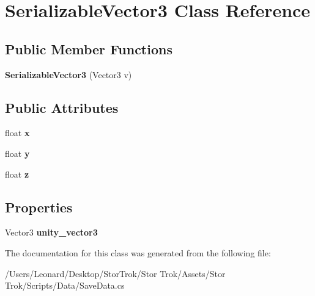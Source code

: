 \hypertarget{class_serializable_vector3}{}\section{Serializable\+Vector3 Class Reference}
\label{class_serializable_vector3}
\subsection*{Public Member Functions}
\begin{DoxyCompactItemize}
\item 
\mbox{\label{class_serializable_vector3_ab073e8b441ca058941b210fea754373c}} 
{\bfseries Serializable\+Vector3} (Vector3 v)
\end{DoxyCompactItemize}
\subsection*{Public Attributes}
\begin{DoxyCompactItemize}
\item 
\mbox{\label{class_serializable_vector3_a3528822b63a9561c84907caf93017a97}} 
float {\bfseries x}
\item 
\mbox{\label{class_serializable_vector3_ae16fc8bdcb05ef764ceb25d184e5a357}} 
float {\bfseries y}
\item 
\mbox{\label{class_serializable_vector3_a711c36688d7ead70f2169053edb9223c}} 
float {\bfseries z}
\end{DoxyCompactItemize}
\subsection*{Properties}
\begin{DoxyCompactItemize}
\item 
\mbox{\label{class_serializable_vector3_a093752c15e617cbe59247e227993778b}} 
Vector3 {\bfseries unity\+\_\+vector3}
\end{DoxyCompactItemize}


The documentation for this class was generated from the following file\+:\begin{DoxyCompactItemize}
\item 
/\+Users/\+Leonard/\+Desktop/\+Stor\+Trok/\+Stor Trok/\+Assets/\+Stor Trok/\+Scripts/\+Data/Save\+Data.\+cs\end{DoxyCompactItemize}
